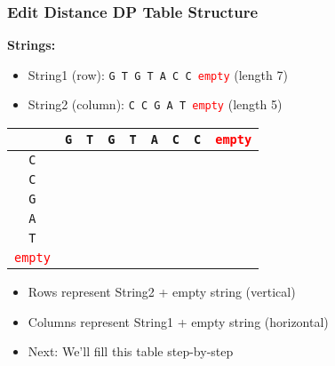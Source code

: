 \documentclass[10pt,aspectratio=43]{beamer}
\begin{document}
\begin{frame}
    \frametitle{Edit Distance DP Table Structure}
    
    \textbf{Strings:} 
    \begin{itemize}
        \item String1 (row): \texttt{G T G T A C C \textcolor{red}{empty}} (length 7)
        \item String2 (column): \texttt{C C G A T \textcolor{red}{empty}} (length 5)
    \end{itemize}
    
    \vspace{0.3cm}
    \begin{center}
    \scriptsize
    \begin{tabular}{|c|c|c|c|c|c|c|c|c|}
        \hline
        & \texttt{G} & \texttt{T} & \texttt{G} & \texttt{T} & \texttt{A} & \texttt{C} & \texttt{C} & \textcolor{red}{\texttt{empty}} \\ \hline
        \texttt{C} & & & & & & & & \\ \hline
        \texttt{C} & & & & & & & & \\ \hline
        \texttt{G} & & & & & & & & \\ \hline
        \texttt{A} & & & & & & & & \\ \hline
        \texttt{T} & & & & & & & & \\ \hline
        \textcolor{red}{\texttt{empty}} & & & & & & & & \\ \hline
    \end{tabular}
    \end{center}
    
    \begin{itemize}
        \item Rows represent String2 + empty string (vertical)
        \item Columns represent String1 + empty string (horizontal)
        \item Next: We'll fill this table step-by-step
    \end{itemize}
\end{frame}
\end{document}
